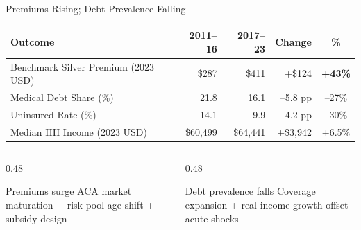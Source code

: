 \documentclass[aspectratio=169,11pt]{beamer}
\newcommand{\emphcolor}[1]{{\color{WarmOrange}\textbf{#1}}}
\newcommand{\tealtext}[1]{{\color{Teal}#1}}
\begin{document}
\begin{frame}{Premiums Rising; Debt Prevalence Falling}
  \begin{center}
    \small
    \begin{tabular}{lrrrc}
      \toprule
      \textbf{Outcome} & \textbf{2011--16} & \textbf{2017--23} & \textbf{Change} & \textbf{\%} \\
      \midrule
      Benchmark Silver Premium (2023 USD) & \$287 & \$411 & +\$124 & \emphcolor{+43\%} \\
      Medical Debt Share (\%)             & 21.8  & 16.1  & --5.8 pp & \tealtext{--27\%} \\
      Uninsured Rate (\%)                 & 14.1  & 9.9   & --4.2 pp & \tealtext{--30\%} \\
      Median HH Income (2023 USD)         & \$60,499 & \$64,441 & +\$3,942 & +6.5\% \\
      \bottomrule
    \end{tabular}
  \end{center}
  \vspace{0.5em}
  \begin{columns}[T]
    \begin{column}{0.48\textwidth}
      \begin{alertblock}{Premiums surge}
        ACA market maturation + risk-pool age shift + subsidy design
      \end{alertblock}
    \end{column}
    \begin{column}{0.48\textwidth}
      \begin{exampleblock}{Debt prevalence falls}
        Coverage expansion + real income growth offset acute shocks
      \end{exampleblock}
    \end{column}
  \end{columns}
\end{frame}
\end{document}
